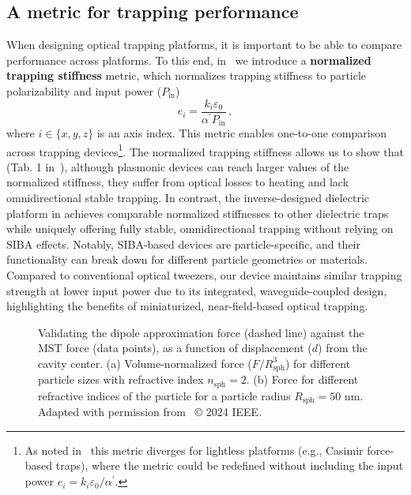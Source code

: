 \subsection*{A metric for trapping performance~\cite{ownpub1}}

When designing optical trapping platforms, it is important to be able to compare performance across platforms. To this end, in~\cite{ownpub3} we introduce a \textbf{normalized
trapping stiffness} metric, which normalizes trapping stiffness to particle  polarizability and input power ($P_\text{in}$)
\begin{equation}
 e_i=\frac{k_i \varepsilon_0}{\alpha^\prime P_{\text{in}}}\,,
\end{equation}
where $i \in \lbrace x,y,z \rbrace$ is an axis index. This metric enables one-to-one comparison across trapping devices\footnote{As noted in~\cite{ownpub3} this metric diverges for lightless platforms (e.g., Casimir force-based traps), where the metric could be redefined
without including the input power $e_i=k_i \varepsilon_0/\alpha^\prime$.}. The normalized trapping stiffness allows us to show that (Tab. 1 in~\cite{ownpub3}), although plasmonic devices can reach larger values of the normalized 
stiffness, they suffer from optical losses to heating and lack omnidirectional stable trapping. In contrast, the inverse-designed dielectric platform in 
 achieves comparable normalized stiffnesses to other dielectric traps while uniquely offering fully stable, omnidirectional trapping
 without relying on SIBA effects. Notably, SIBA-based devices are particle-specific, and their functionality can break down
 for different particle geometries or materials. Compared to conventional optical tweezers, our device maintains similar trapping
 strength at lower input power due to its integrated, waveguide-coupled design, highlighting the benefits of miniaturized,
 near-field-based optical trapping.

 \begin{figure}[tb]
    \centering
    \caption{Validating the dipole approximation force (dashed line) against the MST force (data points), as a function of displacement ($d$) from the cavity center.
    (a) Volume-normalized force ($F/R^3_\text{sph}$) for different particle sizes with refractive index $n_\text{sph}=2$. (b) Force for different refractive indices of the particle for a particle radius $R_\text{sph}=50$ nm. Adapted with permission from~\cite{ownpub3} © 2024 IEEE.}
    \label{fig:SPIE}
\end{figure}

